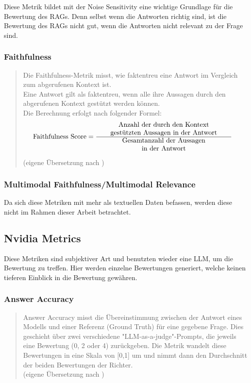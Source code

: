 Diese Metrik bildet mit der Noise Sensitivity eine wichtige Grundlage für die Bewertung des RAGs.
Denn selbst wenn die Antworten richtig sind, ist die Bewertung des RAGs nicht gut, wenn die Antworten nicht relevant zu der Frage sind.

\subsubsection{Faithfulness}
\begin{quote}
Die Faithfulness-Metrik misst, wie faktentreu eine Antwort im Vergleich zum abgerufenen Kontext ist.\\

Eine Antwort gilt als faktentreu, wenn alle ihre Aussagen durch den abgerufenen Kontext gestützt werden können.\\

Die Berechnung erfolgt nach folgender Formel:
\begin{align}
  \text{Faithfulness Score} 
    &= \frac{
        \parbox{7cm}{\centering Anzahl der durch den Kontext\\ gestützten Aussagen in der Antwort}
      }{
        \parbox{7cm}{\centering Gesamtanzahl der Aussagen\\ in der Antwort}
      }
  \end{align}

(eigene Übersetzung nach \cite{ragas_faithfulness})
\end{quote}
\subsubsection{Multimodal Faithfulness/Multimodal Relevance}
Da sich diese Metriken mit mehr als textuellen Daten befassen, werden diese nicht im Rahmen dieser Arbeit betrachtet.


\subsection{Nvidia Metrics}
Diese Metriken sind subjektiver Art und benutzten wieder eine LLM, um die Bewertung zu treffen.
Hier werden einzelne Bewertungen generiert, welche keinen tieferen Einblick in die Bewertung gewähren.

\subsubsection{Answer Accuracy}
\begin{quote}
Answer Accuracy misst die Übereinstimmung zwischen der Antwort eines Modells und einer Referenz (Ground Truth) für eine gegebene Frage. Dies geschieht über zwei verschiedene "LLM-as-a-judge"-Prompts, die jeweils eine Bewertung (0, 2 oder 4) zurückgeben. Die Metrik wandelt diese Bewertungen in eine Skala von [0,1] um und nimmt dann den Durchschnitt der beiden Bewertungen der Richter.
\\
(eigene Übersetzung nach \cite{ragas_nvidia_metrics})
\end{quote}

